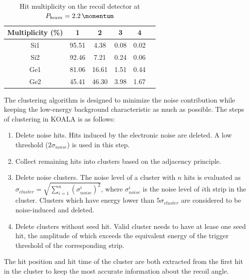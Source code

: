 \documentclass[number,5p]{elsarticle}
\begin{document}
\begin{table}[htbp]
  \label{tab:multiplicity}
  \centering
  \caption{Hit multiplicity on the recoil detector at $P_{beam} = \SI{2.2}{\momentum}$}
  \begin{tabular}{cccccc}
    \hline
    Multiplicity (\si{\percent}) & 1& 2& 3&  4 \\
    \hline
    Si1 & 95.51 & 4.38 & 0.08 & 0.02 \\
    Si2 & 92.46 & 7.21 & 0.24 & 0.06 \\
    Ge1 & 81.06 & 16.61 & 1.51  & 0.44 \\
    Ge2 & 45.41 & 46.30 & 3.98  & 1.67 \\
    \hline
  \end{tabular}
\end{table}

The clustering algorithm is designed to minimize the noise contribution while
keeping the low-energy background characteristic as much as possible.
The steps of clustering in KOALA is as follows:
\begin{enumerate}
\item Delete noise hits. Hits induced by the electronic noise are deleted. A low
  threshold ($2\sigma_{noise}$) is used in this step.
\item Collect remaining hits into clusters based on the adjacency principle.
\item Delete noise clusters. The noise level of a cluster with $n$ hits is evaluated as
  $\sigma_{cluster} = \sqrt{\sum_{i=1}^n{(\sigma_{noise}^i)^2}}$, where $\sigma_{noise}^i$ is
  the noise level of $i$th strip in the cluster. Clusters which have
  energy lower than $5\sigma_{cluster}$ are considered to be noise-induced and deleted.
\item Delete clusters without seed hit. Valid cluster needs to have at lease one seed hit, the
  amplitude of which exceeds the equivalent energy of the trigger threshold of
  the corresponding strip.
\end{enumerate}
The hit position and hit time of the cluster are both extracted from the first
hit in the cluster to keep the most accurate information about the recoil angle.
\end{document}
